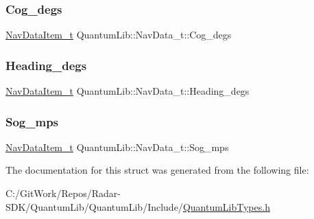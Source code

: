 \subsubsection{\texorpdfstring{Cog\+\_\+degs}{Cog\_degs}}
{\footnotesize\ttfamily \mbox{\hyperlink{struct_quantum_lib_1_1_nav_data_item__t}{Nav\+Data\+Item\+\_\+t}} Quantum\+Lib\+::\+Nav\+Data\+\_\+t\+::\+Cog\+\_\+degs}

\mbox{\label{struct_quantum_lib_1_1_nav_data__t_a32b69821e3fa77219c13de84257d3c4b}} 
\subsubsection{\texorpdfstring{Heading\+\_\+degs}{Heading\_degs}}
{\footnotesize\ttfamily \mbox{\hyperlink{struct_quantum_lib_1_1_nav_data_item__t}{Nav\+Data\+Item\+\_\+t}} Quantum\+Lib\+::\+Nav\+Data\+\_\+t\+::\+Heading\+\_\+degs}

\mbox{\label{struct_quantum_lib_1_1_nav_data__t_aa9ad8dccfff6cdc69e04b615d0e786e8}} 
\subsubsection{\texorpdfstring{Sog\+\_\+mps}{Sog\_mps}}
{\footnotesize\ttfamily \mbox{\hyperlink{struct_quantum_lib_1_1_nav_data_item__t}{Nav\+Data\+Item\+\_\+t}} Quantum\+Lib\+::\+Nav\+Data\+\_\+t\+::\+Sog\+\_\+mps}



The documentation for this struct was generated from the following file\+:\begin{DoxyCompactItemize}
\item 
C\+:/\+Git\+Work/\+Repos/\+Radar-\/\+S\+D\+K/\+Quantum\+Lib/\+Quantum\+Lib/\+Include/\mbox{\hyperlink{_quantum_lib_types_8h}{Quantum\+Lib\+Types.\+h}}\end{DoxyCompactItemize}
